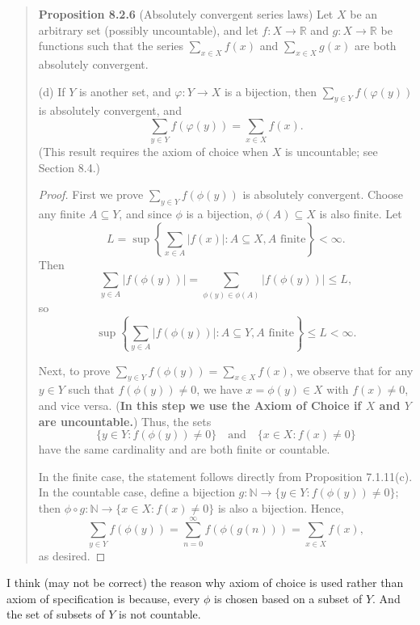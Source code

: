 \documentclass{article}
\begin{document}
\begin{quotation}
    \textbf{Proposition 8.2.6} (Absolutely convergent series laws) Let $X$ be an
    arbitrary set (possibly uncountable), and let $f : X \to \mathbb{R}$ and
    $g : X \to \mathbb{R}$ be functions such that the series
    $\sum_{x \in X} f(x)$ and $\sum_{x \in X} g(x)$ are both absolutely convergent.

    (d) If $Y$ is another set, and $\varphi : Y \to X$ is a bijection, then
    $\sum_{y \in Y} f(\varphi(y))$ is absolutely convergent, and
    \[
        \sum_{y \in Y} f(\varphi(y)) = \sum_{x \in X} f(x).
    \]
    (This result requires the axiom of choice when $X$ is uncountable; see Section 8.4.)

    \begin{proof}
        First we prove $\sum_{y \in Y} f(\phi(y))$ is absolutely convergent. Choose any
        finite $A \subseteq Y$, and since $\phi$ is a bijection, $\phi(A) \subseteq X$
        is also finite. Let
        \[
            L = \sup \left\{ \sum_{x \in A} |f(x)| : A \subseteq X, A \text{ finite} \right\}
            < \infty.
        \]
        Then
        \[
            \sum_{y \in A} |f(\phi(y))| = \sum_{\phi(y) \in \phi(A)} |f(\phi(y))| \leq L,
        \]
        so
        \[
            \sup \left\{ \sum_{y \in A} |f(\phi(y))| : A \subseteq Y, A \text{ finite} \right\}
            \leq L < \infty.
        \]

        Next, to prove $\sum_{y \in Y} f(\phi(y)) = \sum_{x \in X} f(x)$, we observe that
        for any $y \in Y$ such that $f(\phi(y)) \neq 0$, we have $x = \phi(y) \in X$ with
        $f(x) \neq 0$, and vice versa. (\textbf{In this step we use the Axiom of Choice if $X$ and
            $Y$ are uncountable.}) Thus, the sets
        \[
            \{ y \in Y : f(\phi(y)) \neq 0 \} \quad \text{and} \quad
            \{ x \in X : f(x) \neq 0 \}
        \]
        have the same cardinality and are both finite or countable.

        In the finite case, the statement follows directly from Proposition 7.1.11(c).
        In the countable case, define a bijection $g : \mathbb{N} \to
            \{ y \in Y : f(\phi(y)) \neq 0 \}$; then
        $\phi \circ g : \mathbb{N} \to \{ x \in X : f(x) \neq 0 \}$ is also a bijection.
        Hence,
        \[
            \sum_{y \in Y} f(\phi(y)) = \sum_{n=0}^{\infty} f(\phi(g(n))) =
            \sum_{x \in X} f(x),
        \]
        as desired.
    \end{proof}
\end{quotation}
I think (may not be correct) the reason why axiom of choice is used rather than axiom of specification
is because, every $\phi$ is chosen based on a subset of $Y$. And the set of subsets of
$Y$ is not countable.
\end{document}
